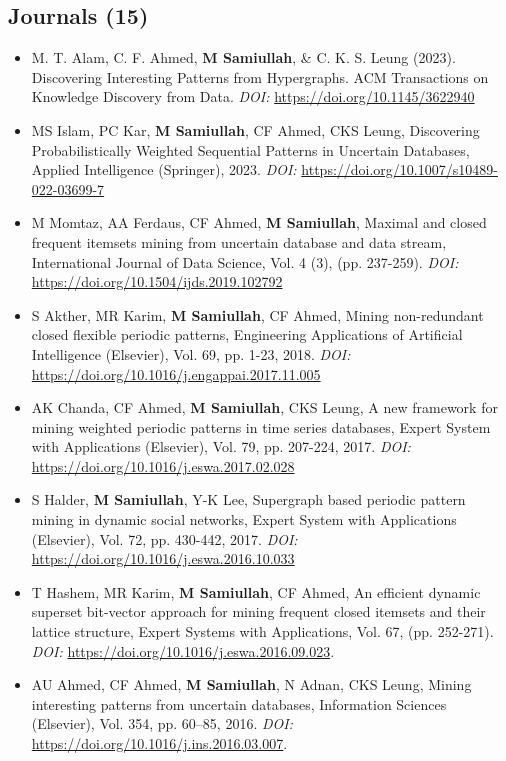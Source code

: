 \documentclass{my_cv}
\begin{document}
\subsection{Journals (15)}
\begin{itemize}[noitemsep]
    \item M. T. Alam, C. F. Ahmed, \textbf{M Samiullah}, \& C. K. S. Leung (2023). Discovering Interesting Patterns from Hypergraphs. ACM Transactions on Knowledge Discovery from Data. {\em DOI:} \url{https://doi.org/10.1145/3622940}
    \item MS Islam, PC Kar, \textbf{M Samiullah}, CF Ahmed, CKS Leung, Discovering Probabilistically Weighted Sequential Patterns in Uncertain Databases, Applied Intelligence (Springer),  2023. {\em DOI:} \url{https://doi.org/10.1007/s10489-022-03699-7}
    \item M Momtaz, AA Ferdaus, CF Ahmed, {\bf M Samiullah}, Maximal and closed frequent itemsets mining from uncertain database and data stream, International Journal of Data Science, Vol. 4 (3), (pp. 237-259). {\em DOI:} \url{https://doi.org/10.1504/ijds.2019.102792}
    \item S Akther, MR Karim, \textbf{M Samiullah}, CF Ahmed, Mining non-redundant closed flexible periodic patterns, Engineering Applications of Artificial Intelligence (Elsevier), Vol. 69, pp. 1-23,  2018. {\em DOI:} \url{https://doi.org/10.1016/j.engappai.2017.11.005}
    \item AK Chanda, CF Ahmed, \textbf{M Samiullah}, CKS Leung, A new framework for mining weighted periodic patterns in time series databases, Expert System with Applications (Elsevier), Vol. 79, pp. 207-224, 2017. {\em DOI:} \url{https://doi.org/10.1016/j.eswa.2017.02.028}
    \item S Halder, \textbf{M Samiullah}, Y-K Lee, Supergraph based periodic pattern mining in dynamic social networks, Expert System with Applications (Elsevier), Vol. 72, pp. 430-442,  2017. {\em DOI:} \url{https://doi.org/10.1016/j.eswa.2016.10.033}
    \item T Hashem, MR Karim, {\bf M Samiullah}, CF Ahmed, An efficient dynamic superset bit-vector approach for mining frequent closed itemsets and their lattice structure, Expert Systems with Applications, Vol. 67, (pp. 252-271). {\em DOI:} \url{https://doi.org/10.1016/j.eswa.2016.09.023}.
    \item AU Ahmed, CF Ahmed, \textbf{M Samiullah}, N Adnan, CKS Leung, Mining interesting patterns from uncertain databases, Information Sciences (Elsevier), Vol. 354, pp. 60–85,  2016. {\em DOI:} \url{https://doi.org/10.1016/j.ins.2016.03.007}.

\end{itemize}
\end{document}
